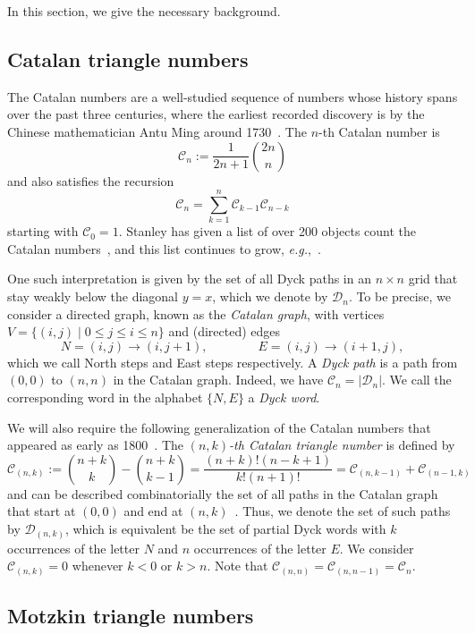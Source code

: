 \documentclass[11pt, leqno]{amsart}
\theoremstyle{plain}
\theoremstyle{definition}
\numberwithin{equation}{section}
\newcommand{\seteq}{\mathbin{:=}}
\newcommand{\Cat}{\mathcal{C}} %
\newcommand{\Dyck}{\mathcal{D}} %
\newcommand{\defn}[1]{{\color{darkred}\emph{#1}}} %
\begin{document}
In this section, we give the necessary background.

\subsection{Catalan triangle numbers}

The Catalan numbers are a well-studied sequence of numbers whose history spans over the past three centuries, where the earliest recorded discovery is by the Chinese mathematician Antu Ming around 1730~\cite{Larcombe99,Luo88}. The $n$-th Catalan number is
\[
\Cat_n \seteq \frac{1}{2n+1} \binom{2n}{n}
\]
and also satisfies the recursion
\begin{equation}
\label{eq:Catalan_recurrence}
\Cat_n = \sum_{k=1}^n \Cat_{k-1} \Cat_{n-k}
\end{equation}
starting with $\Cat_0 = 1$. Stanley has given a list of over 200 objects count the Catalan numbers~\cite{ECII,Stanley15}, and this list continues to grow, {\it e.g.},~\cite{Reynolds15}.

One such interpretation is given by the set of all Dyck paths in an $n \times n$ grid that stay weakly below the diagonal $y = x$, which we denote by $\Dyck_n$. To be precise, we consider a directed graph, known as the \defn{Catalan graph}, with vertices $V = \{(i,j) \mid 0 \leq j \leq i \leq n\}$ and (directed) edges
\[
N = (i,j) \to (i,j+1),
\qquad\qquad
E = (i,j) \to (i+1,j),
\]
which we call North steps and East steps respectively. A \defn{Dyck path} is a path from $(0, 0)$ to $(n, n)$ in the Catalan graph. Indeed, we have $\Cat_n = \lvert \Dyck_n \rvert$. We call the corresponding word in the alphabet $\{ N, E \}$ a \defn{Dyck word}.

We will also require the following generalization of the Catalan numbers that appeared as early as 1800~\cite{Arbogast}. The \defn{$(n,k)$-th Catalan triangle number} is defined by
\[
\Cat_{(n,k)} \seteq \binom{n+k}{k}-\binom{n+k}{k-1} = \frac{(n+k)! (n-k+1)}{k! (n+1)!} = \Cat_{(n,k-1)} + \Cat_{(n-1,k)}
\]
and can be described combinatorially the set of all paths in the Catalan graph that start at $(0,0)$ and end at $(n,k)$~\cite{Bailey96}.
Thus, we denote the set of such paths by $\Dyck_{(n,k)}$, which is equivalent be the set of partial Dyck words with $k$ occurrences of the letter $N$ and $n$ occurrences of the letter $E$.
We consider $\Cat_{(n,k)} = 0$ whenever $k < 0$ or $k > n$.
Note that $\Cat_{(n,n)} = \Cat_{(n,n-1)} = \Cat_n$.


\subsection{Motzkin triangle numbers}
\end{document}
